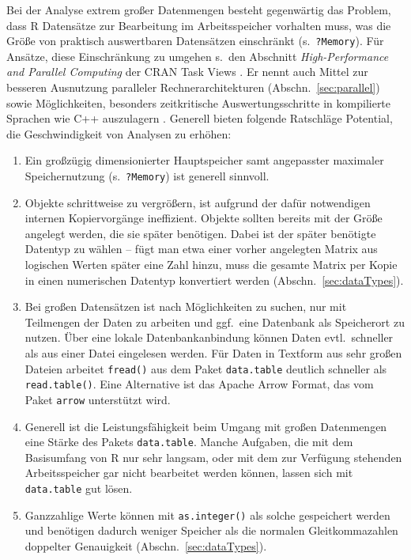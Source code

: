 Bei der Analyse extrem großer Datenmengen besteht gegenwärtig das Problem, dass R Datensätze zur Bearbeitung im Arbeitsspeicher vorhalten muss, was die Größe von praktisch auswertbaren Datensätzen einschränkt (s.\ \lstinline!?Memory!). Für Ansätze, diese Einschränkung zu umgehen s.\ den Abschnitt \emph{High-Performance and Parallel Computing} der CRAN Task Views \cite{CRANtvHPC}. Er nennt auch Mittel zur besseren Ausnutzung paralleler Rechnerarchitekturen (Abschn.\ \ref{sec:parallel}) sowie Möglichkeiten, besonders zeitkritische Auswertungsschritte in kompilierte Sprachen wie C++ auszulagern \cite{Eddelbuettel2013}. Generell bieten folgende Ratschläge Potential, die Geschwindigkeit von Analysen zu erhöhen:
\begin{enumerate}
\item Ein großzügig dimensionierter Hauptspeicher samt angepasster maximaler Speichernutzung (s.\ \lstinline!?Memory!) ist generell sinnvoll.
\item Objekte schrittweise zu vergrößern, ist aufgrund der dafür notwendigen internen Kopiervorgänge ineffizient. Objekte sollten bereits mit der Größe angelegt werden, die sie später benötigen. Dabei ist der später benötigte Datentyp zu wählen -- fügt man etwa einer vorher angelegten Matrix aus logischen Werten später eine Zahl hinzu, muss die gesamte Matrix per Kopie in einen numerischen Datentyp konvertiert werden (Abschn.\ \ref{sec:dataTypes}).
\item Bei großen Datensätzen ist nach Möglichkeiten zu suchen, nur mit Teilmengen der Daten zu arbeiten und ggf.\ eine Datenbank als Speicherort zu nutzen. Über eine lokale Datenbankanbindung können Daten evtl.\ schneller als aus einer Datei eingelesen werden. Für Daten in Textform aus sehr großen Dateien arbeitet \lstinline!fread()! aus dem Paket \lstinline!data.table! deutlich schneller als \lstinline!read.table()!. Eine Alternative ist das Apache Arrow Format, das vom Paket \lstinline!arrow! \cite{Richardson2024} unterstützt wird.
\item Generell ist die Leistungsfähigkeit beim Umgang mit großen Datenmengen eine Stärke des Pakets \lstinline!data.table!. Manche Aufgaben, die mit dem Basisumfang von R nur sehr langsam, oder mit dem zur Verfügung stehenden Arbeitsspeicher gar nicht bearbeitet werden können, lassen sich mit \lstinline!data.table! gut lösen.
\item Ganzzahlige Werte können mit \lstinline!as.integer()! als solche gespeichert werden und benötigen dadurch weniger Speicher als die normalen Gleitkommazahlen doppelter Genauigkeit (Abschn.\ \ref{sec:dataTypes}).

\end{enumerate}

